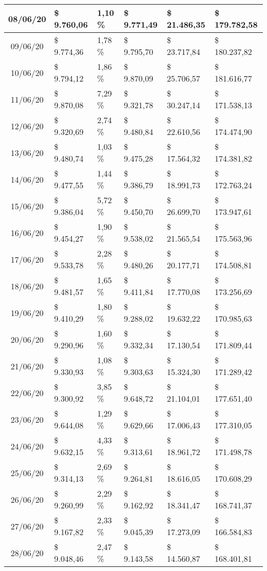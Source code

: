 \begin{small}
\begin{longtable}{|c|l|l|l|l|l|}
08/06/20 & \$ 9.760,06 & 1,10 \% & \$ 9.771,49 & \$ 21.486,35 & \$ 179.782,58 \\ \hline
09/06/20 & \$ 9.774,36 & 1,78 \% & \$ 9.795,70 & \$ 23.717,84 & \$ 180.237,82 \\ \hline
10/06/20 & \$ 9.794,12 & 1,86 \% & \$ 9.870,09 & \$ 25.706,57 & \$ 181.616,77 \\ \hline
11/06/20 & \$ 9.870,08 & 7,29 \% & \$ 9.321,78 & \$ 30.247,14 & \$ 171.538,13 \\ \hline
12/06/20 & \$ 9.320,69 & 2,74 \% & \$ 9.480,84 & \$ 22.610,56 & \$ 174.474,90 \\ \hline
13/06/20 & \$ 9.480,74 & 1,03 \% & \$ 9.475,28 & \$ 17.564,32 & \$ 174.381,82 \\ \hline
14/06/20 & \$ 9.477,55 & 1,44 \% & \$ 9.386,79 & \$ 18.991,73 & \$ 172.763,24 \\ \hline
15/06/20 & \$ 9.386,04 & 5,72 \% & \$ 9.450,70 & \$ 26.699,70 & \$ 173.947,61 \\ \hline
16/06/20 & \$ 9.454,27 & 1,90 \% & \$ 9.538,02 & \$ 21.565,54 & \$ 175.563,96 \\ \hline
17/06/20 & \$ 9.533,78 & 2,28 \% & \$ 9.480,26 & \$ 20.177,71 & \$ 174.508,81 \\ \hline
18/06/20 & \$ 9.481,57 & 1,65 \% & \$ 9.411,84 & \$ 17.770,08 & \$ 173.256,69 \\ \hline
19/06/20 & \$ 9.410,29 & 1,80 \% & \$ 9.288,02 & \$ 19.632,22 & \$ 170.985,63 \\ \hline
20/06/20 & \$ 9.290,96 & 1,60 \% & \$ 9.332,34 & \$ 17.130,54 & \$ 171.809,44 \\ \hline
21/06/20 & \$ 9.330,93 & 1,08 \% & \$ 9.303,63 & \$ 15.324,30 & \$ 171.289,42 \\ \hline
22/06/20 & \$ 9.300,92 & 3,85 \% & \$ 9.648,72 & \$ 21.104,01 & \$ 177.651,40 \\ \hline
23/06/20 & \$ 9.644,08 & 1,29 \% & \$ 9.629,66 & \$ 17.006,43 & \$ 177.310,05 \\ \hline
24/06/20 & \$ 9.632,15 & 4,33 \% & \$ 9.313,61 & \$ 18.961,72 & \$ 171.498,78 \\ \hline
25/06/20 & \$ 9.314,13 & 2,69 \% & \$ 9.264,81 & \$ 18.616,05 & \$ 170.608,29 \\ \hline
26/06/20 & \$ 9.260,99 & 2,29 \% & \$ 9.162,92 & \$ 18.341,47 & \$ 168.741,37 \\ \hline
27/06/20 & \$ 9.167,82 & 2,33 \% & \$ 9.045,39 & \$ 17.273,09 & \$ 166.584,83 \\ \hline
28/06/20 & \$ 9.048,46 & 2,47 \% & \$ 9.143,58 & \$ 14.560,87 & \$ 168.401,81 \\ \hline

\end{longtable}
\end{small}
